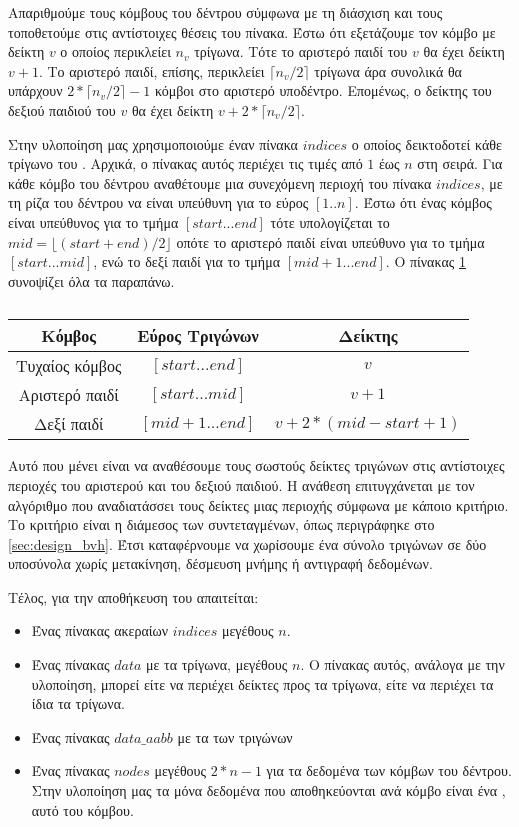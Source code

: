 Απαριθμούμε τους κόμβους του δέντρου σύμφωνα με τη
διάσχιση  και τους τοποθετούμε 
στις αντίστοιχες θέσεις του πίνακα. 
Έστω ότι εξετάζουμε τον κόμβο με δείκτη $v$ ο οποίος 
περικλείει $n_v$ τρίγωνα. 
Τότε το αριστερό παιδί του $v$ θα έχει δείκτη $v+1$.
Το αριστερό παιδί, επίσης, περικλείει $\lceil n_v/2 \rceil$ 
τρίγωνα άρα συνολικά θα υπάρχουν $2*\lceil n_v/2 \rceil - 1$ 
κόμβοι στο αριστερό υποδέντρο.
Επομένως, ο δείκτης του δεξιού παιδιού του $v$ θα έχει δείκτη 
$v + 2*\lceil n_v/2 \rceil$.

Στην υλοποίηση μας χρησιμοποιούμε έναν πίνακα $indices$ ο 
οποίος δεικτοδοτεί κάθε τρίγωνο του .
Αρχικά, ο πίνακας αυτός περιέχει τις τιμές από $1$ έως $n$
στη σειρά.
Για κάθε κόμβο του δέντρου αναθέτουμε μια συνεχόμενη περιοχή του 
πίνακα $indices$, με τη ρίζα του δέντρου να είναι υπεύθυνη 
για το εύρος $[1..n]$.
Έστω ότι ένας κόμβος είναι υπεύθυνος για το τμήμα $[start...end]$ 
τότε υπολογίζεται το $mid = \lfloor (start + end) / 2\rfloor$ οπότε 
το αριστερό παιδί είναι υπεύθυνο για το τμήμα $[start...mid]$, ενώ 
το δεξί παιδί για το τμήμα $[mid+1...end]$. 
Ο πίνακας \ref{tab:node_field_indices} συνοψίζει όλα τα παραπάνω.

\begin{table}
    \centering
    \begin{tabular}{|c|c|c|}
        \hline 
        Κόμβος & Εύρος Τριγώνων & Δείκτης \\
        \hline
        Τυχαίος κόμβος & $[start...end]$ & $v$\\
        Αριστερό παιδί & $[start...mid]$ & $v+1$ \\
        Δεξί παιδί & $[mid+1...end]$ & $v+2*(mid-start+1)$\\
        \hline
    \end{tabular}
    \caption[]{}
    \label{tab:node_field_indices}
\end{table}
Αυτό που μένει είναι να αναθέσουμε τους σωστούς δείκτες τριγώνων 
στις αντίστοιχες περιοχές του αριστερού και του δεξιού παιδιού.
Η ανάθεση επιτυγχάνεται με τον αλγόριθμο \texttt{} 
που αναδιατάσσει τους δείκτες μιας περιοχής σύμφωνα με κάποιο 
κριτήριο.
Το κριτήριο είναι η διάμεσος των συντεταγμένων, όπως περιγράφηκε στο 
\ref{sec:design_bvh}.
Έτσι καταφέρνουμε να χωρίσουμε ένα σύνολο τριγώνων σε δύο υποσύνολα 
χωρίς μετακίνηση, δέσμευση μνήμης ή αντιγραφή δεδομένων.

Τέλος, για την αποθήκευση του  απαιτείται:
\begin{itemize}
    \item Ένας πίνακας ακεραίων $indices$ μεγέθους $n$.
    \item Ένας πίνακας $data$ με τα τρίγωνα, μεγέθους $n$. 
    Ο πίνακας αυτός, ανάλογα με την υλοποίηση, μπορεί 
    είτε να περιέχει δείκτες προς τα τρίγωνα, είτε να 
    περιέχει τα ίδια τα τρίγωνα.
    \item Ένας πίνακας $data\_aabb$ με τα  των τριγώνων 
    \item Ένας πίνακας $nodes$ μεγέθους $2*n - 1$ για τα δεδομένα 
    των κόμβων του δέντρου. 
    Στην υλοποίηση μας τα μόνα δεδομένα που αποθηκεύονται 
    ανά κόμβο είναι ένα , αυτό του κόμβου.
\end{itemize}

